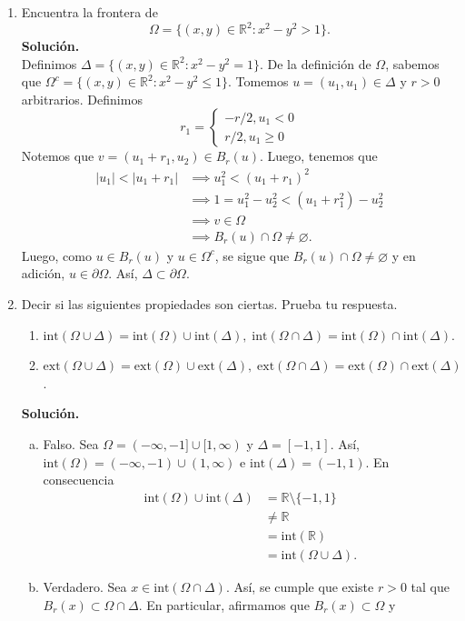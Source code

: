 \documentclass[12pt]{article}
\newcommand{\abs}[1]{\left\vert#1\right\vert}
\newcommand{\Ext}{\mathrm{ext}}
\newcommand{\Int}{\mathrm{int}}
\newcommand{\R}{\mathbb R}
\begin{document}
\begin{enumerate}
\newpage
\item Encuentra la frontera de 
\[ \Omega = \{ (x,y)\in \R^2 : x^2 - y^2 > 1 \}. \]
\textbf{Solución.} \\
Definimos $\Delta = \{(x,y)\in \R^2:x^2-y^2=1\}$. De la definición de $\Omega$, sabemos que $\Omega^c=\{(x,y)\in \R^2:x^2-y^2\leq 1\}$. Tomemos $u=(u_1,u_1) \in \Delta$ y $r>0$ arbitrarios. Definimos
\[
r_1=
\begin{cases}
    -r/2, u_1 < 0 \\
     r/2, u_1 \geq 0
\end{cases}
\]
Notemos que $v=(u_1+r_1,u_2) \in B_r(u)$. Luego, tenemos que
\begin{align*}
    \abs{u_1} < \abs{u_1+r_1} &\implies u_1^2 < (u_1+r_1)^2 \\
    &\implies 1 = u_1^2 - u_2^2 < (u_1+r_1^2) - u_2^2 \\
    &\implies v \in \Omega \\
    &\implies B_r(u)\cap \Omega \neq \varnothing.
\end{align*}
Luego, como $u \in B_r(u)$ y $u \in \Omega^c$, se sigue que $B_r(u)\cap \Omega \neq \varnothing$ y en adición, $u \in \partial\Omega$. Así, $\Delta \subset \partial\Omega$.
\newpage
\item Decir si las siguientes propiedades son ciertas. Prueba tu respuesta.
\begin{enumerate}[(1)]
\item $\Int(\Omega\cup \Delta) = \Int(\Omega)\cup \Int(\Delta),\; \Int(\Omega\cap \Delta) = \Int(\Omega)\cap \Int(\Delta)$.
\item $\Ext(\Omega\cup \Delta) = \Ext(\Omega)\cup \Ext(\Delta),\; \Ext(\Omega\cap \Delta) = \Ext(\Omega)\cap \Ext(\Delta)$.
\end{enumerate}
\textbf{Solución.}
\begin{enumerate}[(a)]
    \item Falso. Sea $\Omega=(-\infty,-1]\cup[1,\infty)$ y $\Delta=[-1,1]$. Así, $\text{int}(\Omega)=(-\infty,-1)\cup(1,\infty)$ e $\text{int}(\Delta)=(-1,1)$. En consecuencia
    \begin{align*}
        \text{int}(\Omega)\cup \text{int}(\Delta) &= \R\setminus \{-1,1\} \\
        &\neq \R \\
        &=\text{int}(\R) \\
        &=\text{int}(\Omega\cup \Delta).
    \end{align*}
    \item Verdadero. Sea $x \in \text{int}(\Omega\cap\Delta)$. Así, se cumple que existe $r>0$ tal que $B_r(x)\subset \Omega \cap \Delta$. En particular, afirmamos que $B_r(x)\subset \Omega$ y

\end{enumerate}
\end{enumerate}
\end{document}
